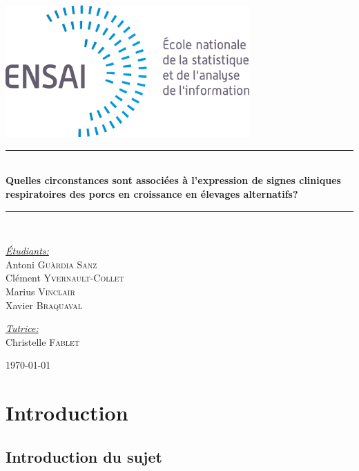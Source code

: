 \documentclass{article}
\begin{document}
\normalsize

\begin{titlepage}
\begin{center}
\includegraphics[width=0.7\textwidth]{images_titre/ensai_logo.png}\\[2.0 cm] 

\rule{\linewidth}{0.4mm} \\[0.4cm]
{\Large\bfseries Quelles circonstances sont associées à l’expression de signes cliniques respiratoires des porcs en croissance en élevages alternatifs?}\\[0.2cm]
\rule{\linewidth}{0.4mm}\\[3cm]

\begin{flushleft} \large
\emph{\underline{Étudiants:}}\\[0.2cm]
Antoni \textsc{Guàrdia Sanz} \\
Clément \textsc{Yvernault-Collet} \\
Marius \textsc{Vinclair}\\
Xavier \textsc{Braquaval}\\
\end{flushleft}

\begin{flushright} \large
\emph{\underline{Tutrice:}} \\[0.2cm]
Christelle \textsc{Fablet} \\[0.6cm]
\end{flushright}

\vfill
{\large \today}
\end{center}
\end{titlepage}

\newpage
\tableofcontents 
\newpage

\section{Introduction}
\subsection{Introduction du sujet}
\end{document}
